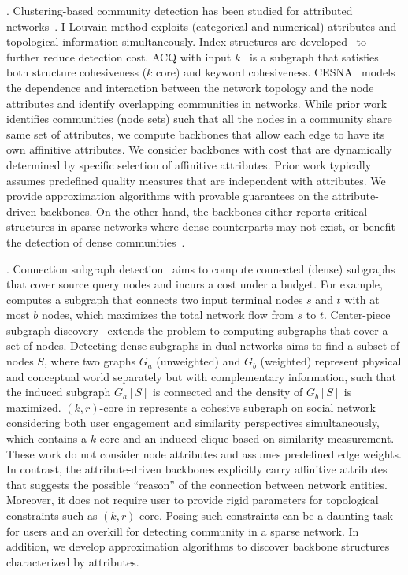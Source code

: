 .
Clustering-based community detection has been studied for attributed networks~\cite{bothorel2015clustering,falih2018community}.
I-Louvain method \cite{combe2015louvain}
exploits (categorical and numerical) attributes and topological information
simultaneously.
Index structures are developed~\cite{huang2017attribute}
to further reduce detection cost. ACQ with input $k$~ \cite{fang2016effective} is a subgraph that satisfies both structure cohesiveness ($k$ core) and keyword cohesiveness.
CESNA~\cite{yang2013community} models the dependence and interaction between the network topology and the node attributes and identify
overlapping communities in networks.
While prior work identifies communities (node sets) such that all the nodes in a community share same
set of attributes, we compute backbones
that allow each edge to have its own affinitive attributes. We consider backbones with cost that are dynamically determined by specific selection of affinitive attributes. Prior work typically assumes predefined quality measures that are independent with attributes. We provide approximation algorithms with provable guarantees on the attribute-driven backbones.
On the other hand, the backbones
either reports critical structures in sparse networks
where dense counterparts may not exist, or
benefit the detection of
dense communities~\cite{huang2017attribute}.

.
Connection subgraph detection~\cite{faloutsos2004fast} aims to compute connected (dense) subgraphs that cover source query nodes and incurs a cost under a budget. For example,
\cite{faloutsos2004fast} computes
a subgraph that connects two input
terminal nodes $s$ and $t$ with at most
$b$ nodes, which maximizes the total
network flow from $s$ to $t$. Center-piece
subgraph discovery~\cite{tong2006center}
extends the problem to computing
subgraphs that cover a set of nodes. Detecting dense subgraphs in dual networks \cite{wu2015finding} aims to find a subset of nodes $S$, where two graphs $G_a$ (unweighted) and $G_b$ (weighted) represent physical and conceptual world separately but with complementary information, such that the induced subgraph ${G_a[S]}$ is connected and the density of ${G_b[S]}$ is maximized.  $(k,r)$-core in \cite{zhang2017engagement} represents a cohesive subgraph on social network considering both user engagement and similarity perspectives simultaneously, which contains a $k$-core and an induced clique based on similarity measurement.
These work do not consider node attributes
and assumes predefined edge weights. In contrast, 
the attribute-driven backbones explicitly carry affinitive attributes that suggests the possible ``reason'' of the connection between 
network entities. Moreover, it does not require user to provide 
rigid parameters for topological constraints such as $(k,r)$-core. Posing such constraints can be a daunting task for users and an overkill for detecting community in a sparse network. 
In addition, we develop approximation 
algorithms to discover backbone structures
characterized by attributes.


